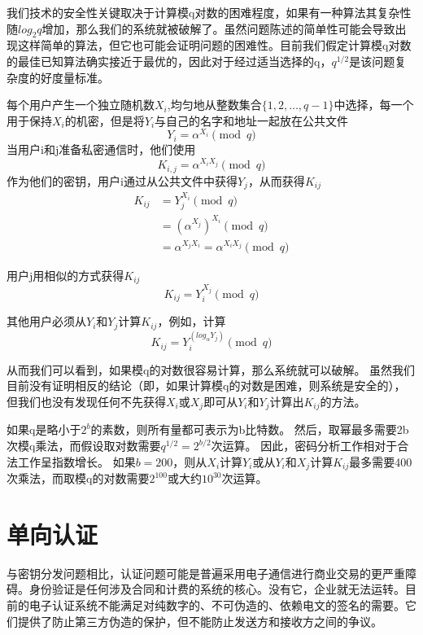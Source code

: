 \documentclass[]{article}
\begin{document}
	我们技术的安全性关键取决于计算模q对数的困难程度，如果有一种算法其复杂性随$log_2 q$增加，那么我们的系统就被破解了。虽然问题陈述的简单性可能会导致出现这样简单的算法，但它也可能会证明问题的困难性。目前我们假定计算模q对数的最佳已知算法确实接近于最优的，因此对于经过适当选择的q，$q^{1/2}$是该问题复杂度的好度量标准。
	
	每个用户产生一个独立随机数$X_i$,均匀地从整数集合$\{1,2,\ldots,q-1\}$中选择，每一个用于保持$X_i$的机密，但是将$Y_i$与自己的名字和地址一起放在公共文件
	\begin{equation}
		Y_i=\alpha ^{X_i} \pmod{q}
	\end{equation}
	当用户i和j准备私密通信时，他们使用
	\begin{equation}
		K_{i,j}=\alpha^{X_i X_j} \pmod{q}
	\end{equation}
	作为他们的密钥，用户i通过从公共文件中获得$Y_j$，从而获得$K_{ij}$
	\begin{align}
		K_{ij}&=Y_j^{X_i} \pmod{q}\\
		      &=(\alpha^{X_j})^{X_i} \pmod{q}\\
		      &=\alpha^{X_jX_i}=\alpha^{X_iX_j} \pmod{q}
	\end{align}
	
	
	用户j用相似的方式获得$K_{ij}$
	\begin{equation}
		K_{ij}=Y_i^{X_j} \pmod{q}
	\end{equation}
	
	其他用户必须从$Y_i$和$Y_j$计算$K_{ij}$，例如，计算
	\begin{equation}
		K_{ij}=Y_i^{(log_\alpha Y_j)} \pmod{q}
	\end{equation}
	
	从而我们可以看到，如果模q的对数很容易计算，那么系统就可以破解。
	虽然我们目前没有证明相反的结论（即，如果计算模q的对数是困难，则系统是安全的），但我们也没有发现任何不先获得$X_i$或$X_j$即可从$Y_i$和$Y_j$计算出$K_{ij}$的方法。
	
	
	如果q是略小于$2^b$的素数，则所有量都可表示为b比特数。
	然后，取幂最多需要2b次模q乘法，而假设取对数需要$q^{1/2}=2^{b/2}$次运算。
	因此，密码分析工作相对于合法工作呈指数增长。
	如果$b=200$，则从$X_i$计算$Y_i$或从$Y_i$和$X_j$计算$K_{ij}$最多需要400次乘法，而取模q的对数需要$2^{100}$或大约$10^{30}$次运算。
	
	\section{单向认证}
	
	与密钥分发问题相比，认证问题可能是普遍采用电子通信进行商业交易的更严重障碍。身份验证是任何涉及合同和计费的系统的核心。没有它，企业就无法运转。目前的电子认证系统不能满足对纯数字的、不可伪造的、依赖电文的签名的需要。它们提供了防止第三方伪造的保护，但不能防止发送方和接收方之间的争议。
	
\end{document}
